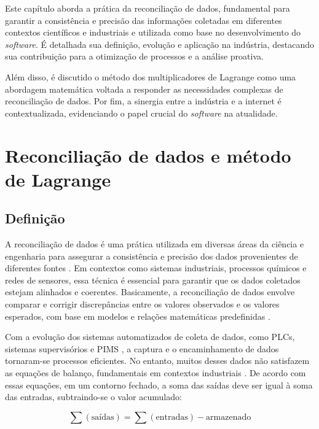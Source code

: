 \label{Cap:ReferencialTeorico}

Este capítulo aborda a prática da reconciliação de dados, fundamental para garantir a consistência e precisão das informações coletadas em diferentes contextos científicos e industriais e utilizada como base no desenvolvimento do \textit{software}. É detalhada sua definição, evolução e aplicação na indústria, destacando sua contribuição para a otimização de processos e a análise proativa. 
    
Além disso, é discutido o método dos multiplicadores de Lagrange como uma abordagem matemática voltada a responder as necessidades complexas de reconciliação de dados. Por fim, a sinergia entre a indústria e a internet é contextualizada, evidenciando o papel crucial do \textit{software} na atualidade.

\section{Reconciliação de dados e método de Lagrange}


\subsection{Definição}

A reconciliação de dados é uma prática utilizada em diversas áreas da ciência e engenharia para assegurar a consistência e precisão dos dados provenientes de diferentes fontes \cite{datarecshakar}. Em contextos como sistemas industriais, processos químicos e redes de sensores, essa técnica é essencial para garantir que os dados coletados estejam alinhados e coerentes. Basicamente, a reconciliação de dados envolve comparar e corrigir discrepâncias entre os valores observados e os valores esperados, com base em modelos e relações matemáticas predefinidas \cite{datarecragnoli}.

Com a evolução dos sistemas automatizados de coleta de dados, como PLCs, sistemas supervisórios e PIMS \cite{plcsupervisory2021}, a captura e o encaminhamento de dados tornaram-se processos eficientes. No entanto, muitos desses dados não satisfazem as equações de balanço, fundamentais em contextos industriais \cite{balance2020}. De acordo com essas equações, em um contorno fechado, a soma das saídas deve ser igual à soma das entradas, subtraindo-se o valor acumulado:

\begin{equation}
    \sum (\text{saídas}) = \sum (\text{entradas}) - \text{armazenado}
\end{equation}

